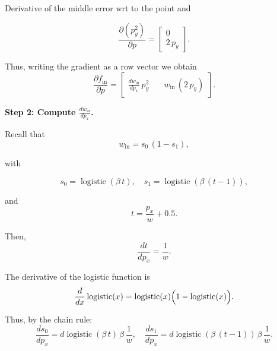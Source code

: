 \documentclass[11pt]{article}
\begin{document}
\begin{section}{Derivative of the middle error wrt to the point}
    and

    \begin{equation}
        \frac{\partial (p_y^2)}{\partial p} =
        \begin{bmatrix} 0 \\[1ex] 2\, p_y \end{bmatrix}.
    \end{equation}

    Thus, writing the gradient as a row vector we obtain
    \begin{equation}
        \frac{\partial f_{\mathrm{in}}}{\partial p} =
        \begin{bmatrix}
            \frac{d w_{\mathrm{in}}}{d p_x}\, p_y^2 & \quad w_{\mathrm{in}}\,(2\,p_y)
        \end{bmatrix}.
    \end{equation}

    \textbf{Step 2: Compute \(\frac{d w_{\mathrm{in}}}{d p_x}\).}

    Recall that
    \begin{equation}
        w_{\mathrm{in}} = s_0\,(1-s_1),
    \end{equation}

    with

    \begin{equation}
        s_0 = \operatorname{logistic}(\beta\, t), \quad s_1 = \operatorname{logistic}(\beta\,(t-1)),
    \end{equation}

    and
    \begin{equation}
        t = \frac{p_x}{w} + 0.5.
    \end{equation}

    Then,
    \begin{equation}
        \frac{d t}{d p_x} = \frac{1}{w}.
    \end{equation}

    The derivative of the logistic function is
    \begin{equation}
        \frac{d}{dx}\operatorname{logistic}(x) = \operatorname{logistic}(x)\Bigl(1-\operatorname{logistic}(x)\Bigr).
    \end{equation}

    Thus, by the chain rule:
    \begin{equation}
        \frac{d s_0}{d p_x} = d\operatorname{logistic}(\beta\,t)\,\beta\,\frac{1}{w},\quad
        \frac{d s_1}{d p_x} = d\operatorname{logistic}(\beta\,(t-1))\,\beta\,\frac{1}{w}.
    \end{equation}


\end{section}
\end{document}
